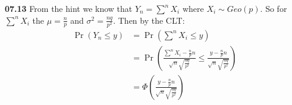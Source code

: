 {\bf 07.13} \quad From the hint we know that $Y_{n} = \sum^{n} X_{i}$ where $X_{i} \sim Geo(p)$. So for
$\sum^{n} X_{i}$ the $\mu = \frac{n}{p}$ and $\sigma^2 = \frac{nq}{p^2}$. Then by the CLT:
\begin{align*}
	\Pr \left( Y_{n} \leq y \right) & = \Pr \left( \sum^{n} X_{i} \leq y \right) \\
	& =  \Pr \left( \frac{\sum^{n} X_{i} - \frac{n}{p} n}{\sqrt{n} \sqrt{\frac{nq}{p^2}}}   \leq 
		\frac{y - \frac{n}{p} n}{\sqrt{n} \sqrt{\frac{nq}{p^2}}} \right) \\
	& = \Phi \left(	\frac{y - \frac{n}{p} n}{\sqrt{n} \sqrt{\frac{nq}{p^2}}} \right) \\
\end{align*}
